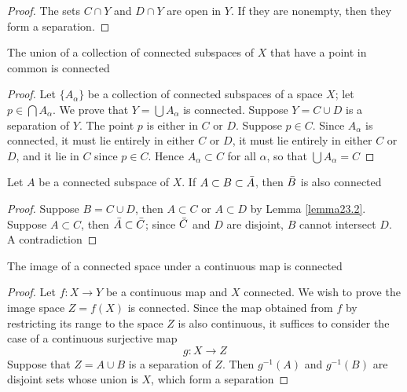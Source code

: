 \documentclass[11pt]{article}
\begin{document}
\begin{proof}
The sets \(C\cap Y\) and \(D\cap Y\) are open in \(Y\). If they are nonempty, then they form a separation.
\end{proof}

\begin{theorem}[]
\label{thm23.3}
The union of a collection of connected subspaces of \(X\) that have a point in common is connected
\end{theorem}

\begin{proof}
Let \(\{A_\alpha\}\) be a collection of connected subspaces of a space \(X\); let \(p\in\bigcap A_\alpha\). We prove
that \(Y=\bigcup A_\alpha\) is connected. Suppose \(Y=C\cup D\) is a separation of \(Y\). The point \(p\) is
either in \(C\) or \(D\). Suppose \(p\in C\). Since \(A_\alpha\) is connected, it must lie entirely in
either \(C\) or \(D\), it must lie entirely in either \(C\) or \(D\), and it lie in \(C\)
since \(p\in C\). Hence \(A_\alpha\subset C\) for all \(\alpha\), so that \(\bigcup A_\alpha=C\)
\end{proof}

\begin{theorem}[]
Let \(A\) be a connected subspace of \(X\). If \(A\subset B\subset\bar{A}\), then \(\bar{B}\) is also connected
\end{theorem}

\begin{proof}
Suppose \(B=C\cup D\), then \(A\subset C\) or \(A\subset D\) by Lemma \ref{lemma23.2}. Suppose \(A\subset C\),
then \(\bar{A}\subset\bar{C}\); since \(\bar{C}\) and \(D\) are disjoint, \(B\) cannot intersect \(D\). A contradiction
\end{proof}

\begin{theorem}[]
The image of a connected space under a continuous map is connected
\end{theorem}

\begin{proof}
Let \(f:X\to Y\) be a continuous map and \(X\) connected. We wish to prove the image
space \(Z=f(X)\) is connected. Since the map obtained from \(f\) by restricting its range to the
space \(Z\) is also continuous, it suffices to consider the case of a continuous surjective map
\begin{equation*}
g:X\to Z
\end{equation*}
Suppose that \(Z=A\cup B\) is a separation of \(Z\). Then \(g^{-1}(A)\) and \(g^{-1}(B)\) are
disjoint sets whose union is \(X\), which form a separation
\end{proof}
\end{document}
